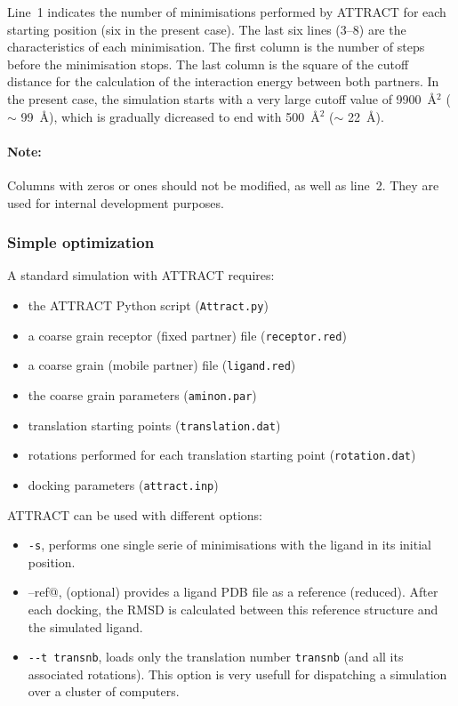 \documentclass[12pt,a4paper]{article}
\begin{document}
Line~1 indicates the number of minimisations performed by ATTRACT
for each starting position (six in the present case). The last six lines (3--8) 
are the characteristics of
each minimisation. The first column is the number of steps before the
minimisation stops.  The last column is the square of the cutoff distance
for the calculation of the interaction energy between both partners. 
In the present case, the simulation starts with a very large cutoff value of 9900~\AA$^2$ 
($\sim$ 99~\AA), which is gradually dicreased
to end with 500~\AA$^2$ ($\sim$ 22~\AA).

\paragraph{Note:} Columns with zeros or ones should not be modified, as
well as line~2. They are used for internal development purposes.

\subsubsection{Simple optimization}

A standard simulation with ATTRACT requires:
\begin{itemize}
\item the ATTRACT Python script ({\tt  Attract.py})
\item a coarse grain receptor (fixed partner) file ({\tt receptor.red})
\item a coarse grain (mobile partner) file ({\tt ligand.red})
\item the coarse grain parameters ({\tt aminon.par})
\item translation starting points ({\tt translation.dat})
\item rotations performed for each translation starting point ({\tt rotation.dat})
\item docking parameters ({\tt attract.inp})
\end{itemize}

ATTRACT can be used with different options:
\begin{itemize}
\item {\tt -s}, performs one single serie of minimisations with the ligand in its initial position.
\item \verb@--ref@, (optional) provides a ligand PDB file as a reference (reduced). After each docking, the RMSD is calculated between this reference structure and the simulated ligand.
\item \verb!--t transnb!, loads only the translation number {\tt transnb} (and all its associated rotations). This option is very usefull for dispatching a simulation over a cluster of computers.
\end{itemize}
\end{document}
